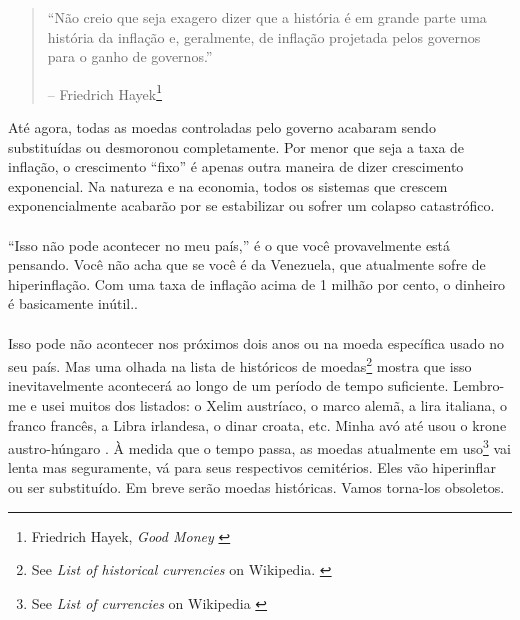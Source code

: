 \begin{quotation}\begin{samepage}
\enquote{Não creio que seja exagero dizer que a história é em grande parte uma história da 
inflação e, geralmente, de inflação projetada pelos governos para o ganho de governos.}
\begin{flushright} -- Friedrich Hayek\footnote{Friedrich Hayek, \textit{Good Money} \cite{hayek-good-money}}
\end{flushright}\end{samepage}\end{quotation}

\newpage

Até agora, todas as moedas controladas pelo governo acabaram sendo
substituídas ou desmoronou completamente. Por menor que seja a taxa de
inflação, o crescimento \enquote{fixo} é apenas outra maneira de dizer crescimento exponencial. 
Na natureza e na economia, todos os sistemas que crescem exponencialmente acabarão 
por se estabilizar ou sofrer um colapso catastrófico.

\paragraph{}
\enquote{Isso não pode acontecer no meu país,} é o que você provavelmente está pensando. 
Você não acha que se você é da Venezuela, que atualmente sofre de hiperinflação. Com uma taxa
de inflação acima de 1 milhão por cento, o dinheiro é basicamente inútil.. \cite{wiki:venezuela}

\paragraph{}
Isso pode não acontecer nos próximos dois anos ou na moeda específica
usado no seu país. Mas uma olhada na lista de históricos de moedas\footnote{See 
\textit{List of historical currencies} on Wikipedia.
\cite{wiki:historical-currencies}} mostra que isso inevitavelmente acontecerá 
ao longo de um período de tempo suficiente. Lembro-me e usei muitos dos listados: o
Xelim austríaco, o marco alemã, a lira italiana, o franco francês, a
Libra irlandesa, o dinar croata, etc. Minha avó até usou o krone austro-húngaro
. À medida que o tempo passa, as moedas atualmente em uso\footnote{See
\textit{List of currencies} on Wikipedia \cite{wiki:list-of-currencies}} vai
lenta mas seguramente, vá para seus respectivos cemitérios. Eles vão hiperinflar ou
ser substituído. Em breve serão moedas históricas. Vamos torna-los obsoletos.

